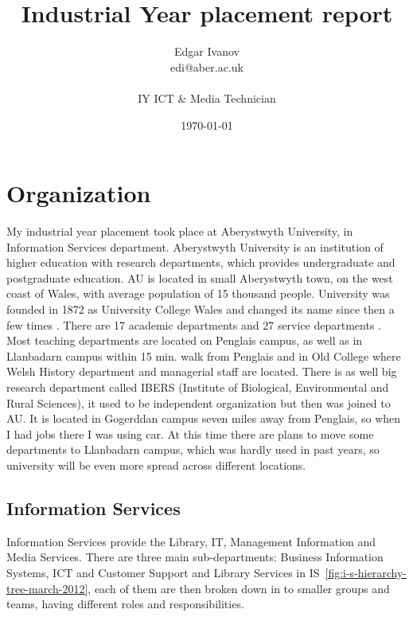 \documentclass[10pt,a4paper,headinclude=true]{report}
\begin{document}
\onehalfspacing
\title{Industrial Year placement report}
\author{Edgar Ivanov\\ edi@aber.ac.uk \\ \\ IY ICT \& Media Technician}
\date{\today}

\maketitle
\tableofcontents

\chapter{Organization}
My industrial year placement took place at Aberystwyth University, in Information Services department. Aberystwyth University is an institution of higher education with research departments, which provides undergraduate and postgraduate education. AU is located in small Aberystwyth town, on the west coast of Wales, with average population of 15 thousand people. University was founded in 1872 as University College Wales and changed its name since then a few times \cite{History}.
There are 17 academic departments and 27 service departments \cite{Departments} \cite{Departments2}. Most teaching departments are located on Penglais campus, as well as in Llanbadarn campus within 15 min. walk from Penglais and in Old College where Welsh History department and managerial staff are located. There is as well big research department called IBERS (Institute of Biological, Environmental and Rural Sciences), it used to be independent organization but then was joined to AU. It is located in Gogerddan campus seven miles away from Penglais, so when I had jobs there I was using car. At this time there are plans to move some departments to Llanbadarn campus, which was hardly used in past years, so university will be even more spread across different locations.

\section{Information Services}
Information Services provide the Library, IT, Management Information and Media Services. There are three main sub-departments: Business Information Systems, ICT and Customer Support and Library Services in IS~\ref{fig:i-s-hierarchy-tree-march-2012}, each of them are then broken down in to smaller groups and teams, having different roles and responsibilities.
\end{document}
